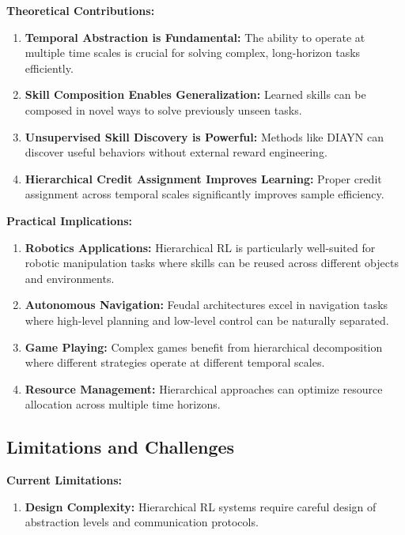 \documentclass[12pt]{article}
\begin{document}
{{\textbf{Theoretical Contributions:}
\begin{enumerate}
    \item \textbf{Temporal Abstraction is Fundamental:} The ability to operate at multiple time scales is crucial for solving complex, long-horizon tasks efficiently.
    
    \item \textbf{Skill Composition Enables Generalization:} Learned skills can be composed in novel ways to solve previously unseen tasks.
    
    \item \textbf{Unsupervised Skill Discovery is Powerful:} Methods like DIAYN can discover useful behaviors without external reward engineering.
    
    \item \textbf{Hierarchical Credit Assignment Improves Learning:} Proper credit assignment across temporal scales significantly improves sample efficiency.
\end{enumerate}

\textbf{Practical Implications:}
\begin{enumerate}
    \item \textbf{Robotics Applications:} Hierarchical RL is particularly well-suited for robotic manipulation tasks where skills can be reused across different objects and environments.
    
    \item \textbf{Autonomous Navigation:} Feudal architectures excel in navigation tasks where high-level planning and low-level control can be naturally separated.
    
    \item \textbf{Game Playing:} Complex games benefit from hierarchical decomposition where different strategies operate at different temporal scales.
    
    \item \textbf{Resource Management:} Hierarchical approaches can optimize resource allocation across multiple time horizons.
\end{enumerate}

\subsection{Limitations and Challenges}

\textbf{Current Limitations:}
\begin{enumerate}
    \item \textbf{Design Complexity:} Hierarchical RL systems require careful design of abstraction levels and communication protocols.
    

\end{enumerate}}}
\end{document}
